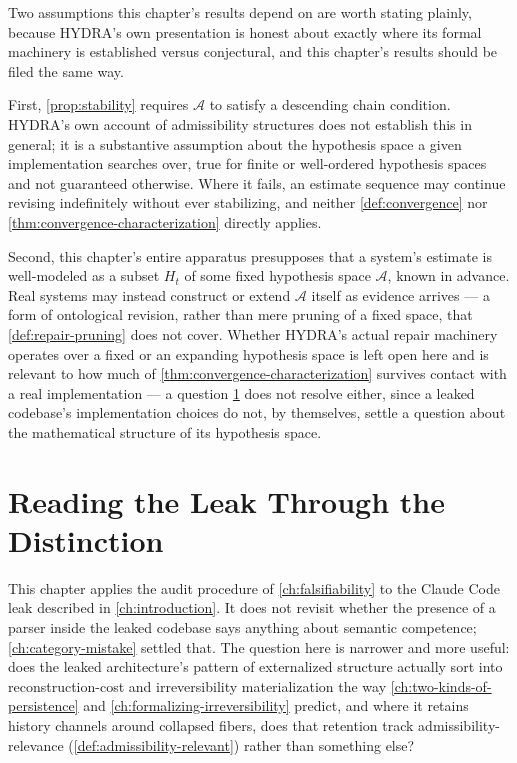 \documentclass[11pt]{book}
\theoremstyle{plain}
\theoremstyle{definition}
\theoremstyle{remark}
\begin{document}
Two assumptions this chapter's results depend on are worth stating
plainly, because HYDRA's own presentation is honest about exactly
where its formal machinery is established versus conjectural, and this
chapter's results should be filed the same way.

First, \cref{prop:stability} requires $\mathcal{A}$ to satisfy a
descending chain condition. HYDRA's own account of admissibility
structures does not establish this in general; it is a substantive
assumption about the hypothesis space a given implementation searches
over, true for finite or well-ordered hypothesis spaces and not
guaranteed otherwise. Where it fails, an estimate sequence may
continue revising indefinitely without ever stabilizing, and neither
\cref{def:convergence} nor \cref{thm:convergence-characterization}
directly applies.

Second, this chapter's entire apparatus presupposes that a system's
estimate is well-modeled as a subset $H_t$ of some fixed hypothesis
space $\mathcal{A}$, known in advance. Real systems may instead
construct or extend $\mathcal{A}$ itself as evidence arrives --- a
form of ontological revision, rather than mere pruning of a fixed
space, that \cref{def:repair-pruning} does not cover. Whether HYDRA's
actual repair machinery operates over a fixed or an expanding
hypothesis space is left open here and is relevant to how much of
\cref{thm:convergence-characterization} survives contact with a real
implementation --- a question \cref{ch:reading-the-leak} does not
resolve either, since a leaked codebase's implementation choices do
not, by themselves, settle a question about the mathematical structure
of its hypothesis space.
\chapter{Reading the Leak Through the Distinction}
\label{ch:reading-the-leak}

This chapter applies the audit procedure of \cref{ch:falsifiability} to
the Claude Code leak described in \cref{ch:introduction}. It does not
revisit whether the presence of a parser inside the leaked codebase
says anything about semantic competence; \cref{ch:category-mistake}
settled that. The question here is narrower and more useful: does the
leaked architecture's pattern of externalized structure actually sort
into reconstruction-cost and irreversibility materialization the way
\cref{ch:two-kinds-of-persistence} and \cref{ch:formalizing-irreversibility}
predict, and where it retains history channels around collapsed
fibers, does that retention track admissibility-relevance
(\cref{def:admissibility-relevant}) rather than something else?
\end{document}
